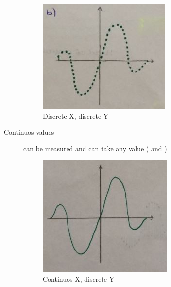 \begin{description}
		\begin{figure}[!h]
			\centering
			\includegraphics[width=0.7\linewidth]{images/discreteY_discreteX}
			\caption[Discrete X, discrete Y]{Discrete X, discrete Y}
			\label{fig:discreteY_discreteX}
		\end{figure}

	\item[Continuos values] can be measured and can take any value ( and )
		\begin{figure}[!h]
			\centering
			\includegraphics[width=0.7\linewidth]{images/ContinuosX_continuosY}
			\caption{Continuos X, discrete Y}
			\label{fig:ContinuosX_continuosY}
		\end{figure}
		

\end{description}
